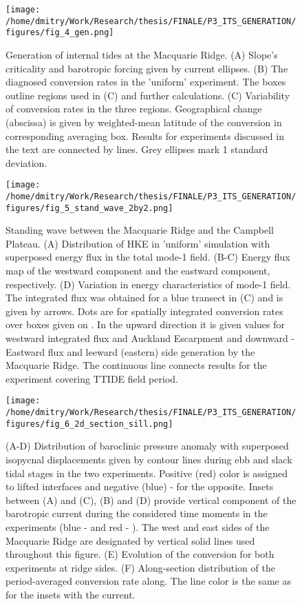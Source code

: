 \documentclass[12pt]{article}
\newcommand{\SCALEO}{2}
\begin{document}
\begin{figure}
	\centering
	\texttt{[image: /home/dmitry/Work/Research/thesis/FINALE/P3\_ITS\_GENERATION/figures/fig\_4\_gen.png]}
	\caption{Generation of internal tides at the Macquarie Ridge. (A) Slope's criticality and 
	barotropic forcing given by current ellipses. (B) The diagnosed conversion rates in the 
	'uniform' experiment. The boxes outline regions used in (C) and further calculations. (C) 
	Variability of conversion rates in the three regions. Geographical change (abscissa) is given 
	by weighted-mean latitude of the conversion in corresponding averaging box. Results for 
	experiments discussed in the text are connected by lines. Grey ellipses mark 1 standard 
	deviation.}
	\label{C3.fig:gen}
\end{figure}

\begin{figure}
	\centering
	\texttt{[image: /home/dmitry/Work/Research/thesis/FINALE/P3\_ITS\_GENERATION/figures/fig\_5\_stand\_wave\_2by2.png]}
	\caption{Standing wave between the Macquarie Ridge and the Campbell Plateau. (A) Distribution 
	of HKE in 'uniform' simulation with superposed energy flux in the total mode-1 field. (B-C) 
	Energy flux map of the westward component and the eastward component, respectively. (D) 
	Variation in energy characteristics of mode-1 field. The integrated flux was obtained for a 	
	blue transect in (C) and is given by arrows. Dots are for spatially integrated conversion rates 
	over boxes given on . In the upward direction it is given values for 
	westward integrated flux and Auckland Escarpment and downward - Eastward flux and leeward 
	(eastern) side generation by the Macquarie Ridge. The continuous line connects results for the 
	experiment covering TTIDE field period.}
	\label{C3.fig:stand_wave}
\end{figure}

\begin{figure}
	\centering
	\texttt{[image: /home/dmitry/Work/Research/thesis/FINALE/P3\_ITS\_GENERATION/figures/fig\_6\_2d\_section\_sill.png]}
	\caption{(A-D) Distribution of baroclinic pressure anomaly with superposed isopycnal 
	displacements given by contour lines during ebb and slack tidal stages in the two experiments. 
	Positive (red) color is assigned to lifted interfaces and negative (blue) - for the opposite. 
	Insets between (A) and (C), (B) and (D) provide vertical component of the barotropic current 
	during the considered time moments in the experiments (blue -  and red - 
	). The west and east sides of the Macquarie Ridge are 
	designated by vertical solid lines used throughout this figure. (E) Evolution of the conversion 
	for both experiments at ridge sides. (F) Along-section distribution of the period-averaged 
	conversion rate along. The line color is the same as for the insets with the current.}
	\label{C3.fig:gen_2d}
\end{figure}
\end{document}
